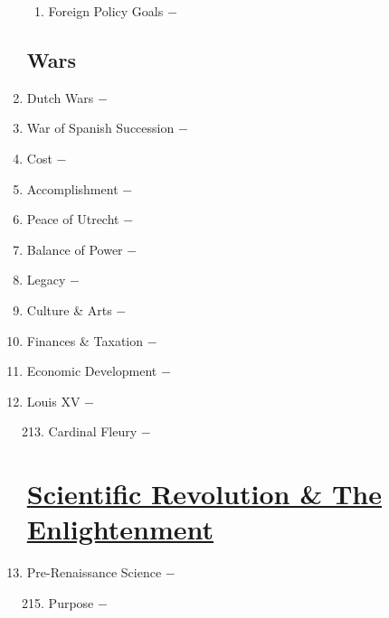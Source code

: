 \documentclass[12pt]{article}
\begin{document}
\begin{enumerate}
\begin{enumerate}[label=\arabic{*}.]
\item Foreign Policy Goals $-$ 

\end{enumerate}

\subsection{Wars}
\setcounter{enumi}{201}

\item Dutch Wars $-$

\item War of Spanish Succession $-$

\item Cost $-$ 

\item Accomplishment $-$ 

\item Peace of Utrecht $-$ 

\item Balance of Power $-$ 

\item Legacy $-$ 

\item Culture \& Arts $-$ 

\item Finances \& Taxation $-$ 

\item Economic Development $-$ 

\item Louis XV $-$ 

\begin{enumerate}[label=\arabic{*}.]
\setcounter{enumii}{212}
 
\item Cardinal Fleury $-$ 

\end{enumerate}
\setcounter{enumi}{213}

\section{\underline{Scientific Revolution \& The Enlightenment}}

\item Pre-Renaissance Science $-$ 

\begin{enumerate}[label=\arabic{*}.]
\setcounter{enumii}{214}

\item Purpose $-$ 


\end{enumerate}
\end{enumerate}
\end{document}
